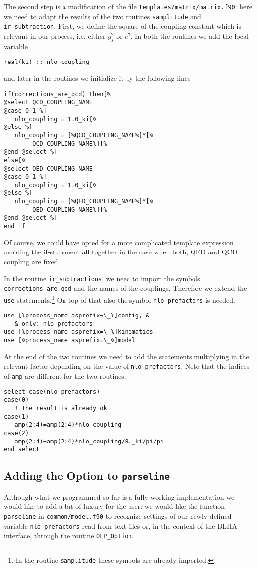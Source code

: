\documentclass[11pt,a4paper]{refrep}
\begin{document}
The second step is a modification of the file
\texttt{templates/\hspace{0pt}matrix/\hspace{0pt}matrix.f90}:
here we need to adapt the results
of the two routines \texttt{samplitude} and
\texttt{ir\_subtraction}. First, we define the square of the coupling
constant which is relevant in our process, i.e. either $g_s^2$ or $e^2$.
In both the routines we add the local variable
\begin{lstlisting}
real(ki) :: nlo_coupling
\end{lstlisting}
and later in the routines we initialize it by the following lines
\begin{lstlisting}
if(corrections_are_qcd) then[%
@select QCD_COUPLING_NAME
@case 0 1 %]
   nlo_coupling = 1.0_ki[%
@else %]
   nlo_coupling = [%QCD_COUPLING_NAME%]*[%
        QCD_COUPLING_NAME%][%
@end @select %]
else[%
@select QED_COUPLING_NAME
@case 0 1 %]
   nlo_coupling = 1.0_ki[%
@else %]
   nlo_coupling = [%QED_COUPLING_NAME%]*[%
        QED_COUPLING_NAME%][%
@end @select %]
end if
\end{lstlisting}
Of course, we could have opted for a more complicated template
expression avoiding the if-statement all together in the case
when both, QED and QCD coupling are fixed.

In the routine \texttt{ir\_subtractions}, we need to import the
symbols \texttt{corrections\_are\_qcd} and the names of the
couplings. Therefore we extend the \texttt{use} statements.\footnote{
In the routine \texttt{samplitude} these symbols are already imported.}
On top of that also the symbol \texttt{nlo\_prefactors} is needed.
\begin{lstlisting}
use [%process_name asprefix=\_%]config, &
   & only: nlo_prefactors
use [%process_name asprefix=\_%]kinematics
use [%process_name asprefix=\_%]model
\end{lstlisting}

At the end of the two routines we need to add the statements
multiplying in the relevant factor depending on the value
of  \texttt{nlo\_prefactors}. 
Note that the indices of \texttt{amp} are different for the two routines.
\begin{lstlisting}
select case(nlo_prefactors)
case(0)
   ! The result is already ok
case(1)
   amp(2:4)=amp(2:4)*nlo_coupling
case(2)
   amp(2:4)=amp(2:4)*nlo_coupling/8._ki/pi/pi
end select
\end{lstlisting}

\subsection{Adding the Option to \texttt{parseline}}
\label{ssec:nlo-prefactors:02}
Although what we programmed so far is a fully working implementation
we would like to add a bit of luxury for the user: we would like
the function \texttt{parseline} in \texttt{common/\hspace{0pt}model.f90}
to recognize settings of our newly defined variable \texttt{nlo\_prefactors}
read from text files or, in the context of the BLHA interface,
through the routine \texttt{OLP\_Option}.
\end{document}
